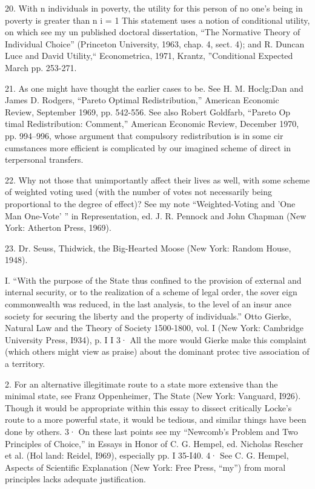 \documentclass[11pt,openany]{book}
\begin{document}
{20. With n individuals in poverty, the utility for this person of no one's being in poverty is greater than n i = 1 This statement uses a notion of conditional utility, on which see my un published doctoral dissertation, ``The Normative Theory of Individual Choice'' (Princeton University, 1963, chap. 4, sect. 4); and R. Duncan Luce and David Utility,`` Econometrica, 1971, Krantz, ''Conditional Expected March pp. 253-271.\par

21. As one might have thought the earlier cases to be. See H. M. Hoclg:Dan and James D. Rodgers, ``Pareto Optimal Redistribution,'' American Economic Review, September 1969, pp. 542-556. See also Robert Goldfarb, ``Pareto Op timal Redistribution: Comment,'' American Economic Review, December 1970, pp. 994--996, whose argument that compulsory redistribution is in some cir cumstances more efficient is complicated by our imagined scheme of direct in terpersonal transfers.\par

22. Why not those that unimportantly affect their lives as well, with some scheme of weighted voting used (with the number of votes not necessarily being proportional to the degree of effect)? See my note ``Weighted-Voting and 'One Man One-Vote' '' in Representation, ed. J. R. Pennock and John Chapman (New York: Atherton Press, 1969).\par

23. Dr. Seuss, Thidwick, the Big-Hearted Moose (New York: Random House, 1948).\par

I. ``With the purpose of the State thus confined to the provision of external and internal security, or to the realization of a scheme of legal order, the sover eign commonwealth was reduced, in the last analysis, to the level of an insur ance society for securing the liberty and the property of individuals.'' Otto Gierke, Natural Law and the Theory of Society 1500-1800, vol. I (New York: Cambridge University Press, I934), p. I I 3· All the more would Gierke make this complaint (which others might view as praise) about the dominant protec tive association of a territory.\par

2. For an alternative illegitimate route to a state more extensive than the minimal state, see Franz Oppenheimer, The State (New York: Vanguard, I926). Though it would be appropriate within this essay to dissect critically Locke's route to a more powerful state, it would be tedious, and similar things have been done by others. 3· On these last points see my ``Newcomb's Problem and Two Principles of Choice,'' in Essays in Honor of C. G. Hempel, ed. Nicholas Rescher et al. (Hol land: Reidel, I969), especially pp. I 35-I40. 4· See C. G. Hempel, Aspects of Scientific Explanation (New York: Free Press, ``my'') from moral principles lacks adequate justification.\par

}
\end{document}
